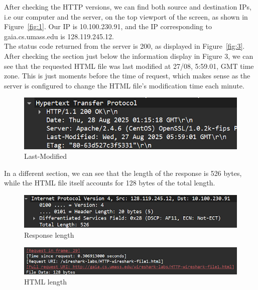 After checking the HTTP versions, we can find both source and destination IPs,
i.e our computer and the server, on the top viewport of the screen, as shown in
Figure~\ref{fig:1}. Our IP is 10.100.230.91, and the IP corresponding to
gaia.cs.umass.edu is 128.119.245.12.\\

The status code returned from the server is 200, as displayed in
Figure~\ref{fig:3}.\\

After checking the section just below the information display in Figure 3, we
can see that the requested HTML file was last modified at 27/08, 5:59.01, GMT
time zone. This is just moments before the time of request, which makes sense
as the server is configured to change the HTML file's modification time each
minute.

\begin{figure}[htbp]
    \centering
    \includegraphics[width=1\linewidth]{img/4.png}
    \caption{Last-Modified}\label{fig:4}
\end{figure}

In a different section, we can see that the length of the response is 526
bytes, while the HTML file itself accounts for 128 bytes of the total length.

\begin{figure}[htbp]
    \centering
    \includegraphics[width=1\linewidth]{img/5.png}
    \caption{Response length}\label{fig:5}
\end{figure}

\begin{figure}[htbp]
    \centering
    \includegraphics[width=1\linewidth]{img/6.png}
    \caption{HTML length}\label{fig:6}
\end{figure}

